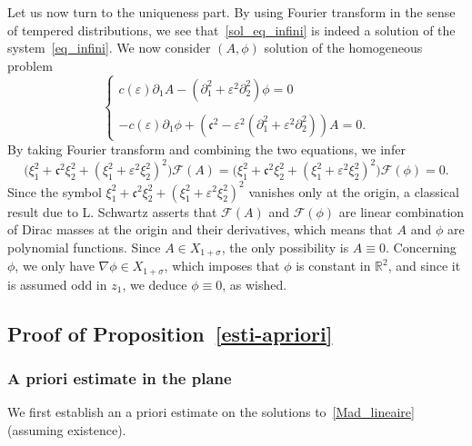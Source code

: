 \documentclass[AHL,Unicode,longabstracts,published]{cedram}
\newcommand*\p{\partial}
\newcommand*\R{\mathbb R}
\newcommand*\ds{\displaystyle}
\newcommand*\Fou{\mathscr{F}}
\newcommand*\cs{{\mathfrak c}}
\newcommand*\e{\varepsilon}
\newcommand*\s{\sigma}
\begin{document}
Let us now turn to the uniqueness part. By using Fourier transform in the sense of tempered distributions, we see that~\eqref{sol_eq_infini} is indeed a solution of the system~\eqref{eq_infini}. We now consider $ (A, \phi) $ solution of the homogeneous problem
\begin{equation*}
\left\{
\begin{array}{ll}
\ds{ c(\e) \p_{1} A - \left(\p_{1}^2 + \e^2 \p^2_{2}\right) \phi = 0 }\\ \ \\
\ds{ - c(\e) \p_{1} \phi + \left(\cs^2 - \e^2\left(\p_{1}^2 + \e^2 \p_{2}^2\right)\right) A = 0.}
\end{array}\right.
\end{equation*}
By taking Fourier transform and combining the two equations, we infer
\[
\Big(\xi_1^2 + \cs^2 \xi_2^2 + \left(\xi_1^2 + \e^2 \xi_2^2\right)^2 \Big) \Fou(A) = \Big(\xi_1^2 + \cs^2 \xi_2^2 + \left(\xi_1^2 + \e^2 \xi_2^2\right)^2 \Big) \Fou(\phi) = 0.
\]
Since the symbol $ \xi_1^2 + \cs^2 \xi_2^2 + (\xi_1^2 + \e^2\xi_2^2)^2 $ vanishes only at the origin, a classical result due to L. Schwartz asserts that $ \Fou(A) $ and $ \Fou(\phi) $ are linear combination of Dirac masses at the origin and their derivatives, which means that $ A $ and $ \phi $ are polynomial functions. Since $ A \in X_{1+\s} $, the only possibility is $A \equiv 0 $. Concerning $ \phi $, we only have $ \nabla \phi \in X_{1+\s} $, which imposes that $ \phi $ is constant in $ \R^2 $, and since it is assumed odd in $ z_1 $, we deduce $ \phi \equiv 0 $, as wished.



\subsection{Proof of Proposition~\ref{esti-apriori}}



\subsubsection{A priori estimate in the plane}

We first establish an a priori estimate on the solutions to~\eqref{Mad_lineaire} (assuming existence).
\end{document}
